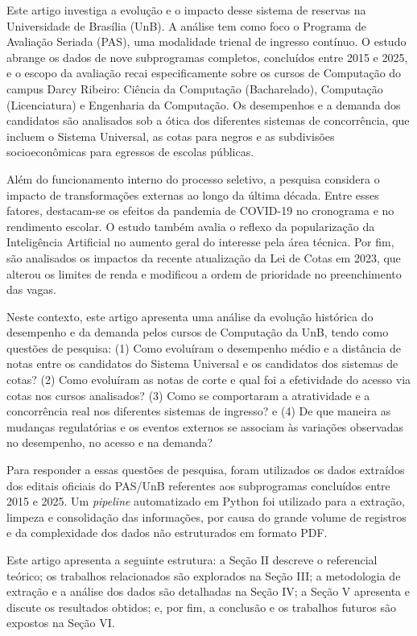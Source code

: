 \documentclass[12pt]{article}
\begin{document}
Este artigo investiga a evolução e o impacto desse sistema de reservas na Universidade de Brasília (UnB). A análise tem como foco o Programa de Avaliação Seriada (PAS), uma modalidade trienal de ingresso contínuo. O estudo abrange os dados de nove subprogramas completos, concluídos entre 2015 e 2025, e o escopo da avaliação recai especificamente sobre os cursos de Computação do campus Darcy Ribeiro: Ciência da Computação (Bacharelado), Computação (Licenciatura) e Engenharia da Computação. Os desempenhos e a demanda dos candidatos são analisados sob a ótica dos diferentes sistemas de concorrência, que incluem o Sistema Universal, as cotas para negros e as subdivisões socioeconômicas para egressos de escolas públicas.

Além do funcionamento interno do processo seletivo, a pesquisa considera o impacto de transformações externas ao longo da última década. Entre esses fatores, destacam-se os efeitos da pandemia de COVID-19 no cronograma e no rendimento escolar. O estudo também avalia o reflexo da popularização da Inteligência Artificial no aumento geral do interesse pela área técnica. Por fim, são analisados os impactos da recente atualização da Lei de Cotas em 2023, que alterou os limites de renda e modificou a ordem de prioridade no preenchimento das vagas.

Neste contexto, este artigo apresenta uma análise da evolução histórica do desempenho e da demanda pelos cursos de Computação da UnB, tendo como questões de pesquisa: (1) Como evoluíram o desempenho médio e a distância de notas entre os candidatos do Sistema Universal e os candidatos dos sistemas de cotas? (2) Como evoluíram as notas de corte e qual foi a efetividade do acesso via cotas nos cursos analisados? (3) Como se comportaram a atratividade e a concorrência real nos diferentes sistemas de ingresso? e (4) De que maneira as mudanças regulatórias e os eventos externos se associam às variações observadas no desempenho, no acesso e na demanda? 

Para responder a essas questões de pesquisa, foram utilizados os dados extraídos dos editais oficiais do PAS/UnB referentes aos subprogramas concluídos entre 2015 e 2025. Um \textit{pipeline} automatizado em Python foi utilizado para a extração, limpeza e consolidação das informações, por causa do grande volume de registros e da complexidade dos dados não estruturados em formato PDF.

Este artigo apresenta a seguinte estrutura: a Seção II descreve o referencial teórico; os trabalhos relacionados são explorados na Seção III; a metodologia de extração e a análise dos dados são detalhadas na Seção IV; a Seção V apresenta e discute os resultados obtidos; e, por fim, a conclusão e os trabalhos futuros são expostos na Seção VI.
\end{document}
